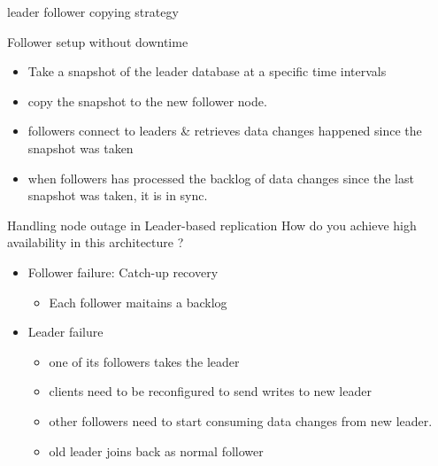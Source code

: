 \documentclass[9pt]{beamer}
\begin{document}

\begin{frame}{leader follower copying strategy}
\end{frame}


\begin{frame}{Follower setup without downtime}
  \begin{itemize}
      \pause
    \item Take a snapshot of the leader database at a specific time intervals
      \pause
    \item copy the snapshot to the new follower node.
      \pause
    \item followers connect to leaders \& retrieves data changes happened since the snapshot was taken
      \pause
    \item when followers has processed the backlog of data changes since the last snapshot was taken, it is in sync.
      \pause
  \end{itemize}
\end{frame}


\begin{frame}{Handling node outage in Leader-based replication}
  How do you achieve high availability in this architecture ?
  \begin{itemize}
      \pause
    \item Follower failure: Catch-up recovery
      \pause
      \begin{itemize}
        \item Each follower maitains a backlog
      \end{itemize}
      \pause
    \item Leader failure
      \pause
      \begin{itemize}
      \item one of its followers takes the leader
      \item clients need to be reconfigured to send writes to new leader
      \item other followers need to start consuming data changes from new leader.
      \item old leader joins back as normal follower
      \end{itemize}
  \end{itemize}
\end{frame}
\end{document}
